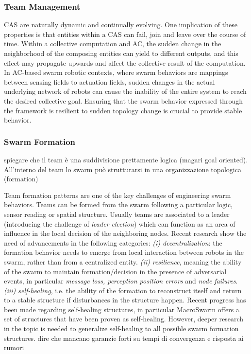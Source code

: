 \documentclass[12pt]{article}
\begin{document}
\subsubsection{Team Management}
CAS are naturally dynamic and continually evolving. One implication of these properties is that entities within a CAS can fail, join and leave over the course of time.
Within a collective computation and AC, the sudden change in the neighborhood of the composing entities can yield to different outputs, and this effect may propagate upwards and
affect the collective result of the computation. In AC-based swarm robotic contexts, where swarm behaviors are mappings between sensing fields to actuation fields, sudden changes
in the actual underlying network of robots can cause the inability of the entire system to reach the desired collective goal. Ensuring that the swarm behavior expressed through the
framework is resilient to sudden topology change is crucial to provide stable behavior. 

\subsubsection{Swarm Formation}
spiegare che il team è una suddivisione prettamente logica (magari goal oriented).
All'interno del team lo swarm può strutturarsi in una organizzazione topologica (formation)

Team formation patterns are one of the key challenges of engineering swarm behaviors. 
Teams can be formed from the swarm following a particular logic, sensor reading or spatial structure. Usually teams 
are associated to a leader (introducing the challenge of \textit{leader election}) which can function as an area of influence in the
local decision of the neighboring nodes. Recent research show the need of advancements in the following categories:
\textit{(i) decentralization}: the formation behavior needs to emerge from local interaction between robots in the swarm, rather than from a centralized entity. 
\textit{(ii) resilience}, meaning the ability of the swarm to maintain formation/decision
in the presence of adversarial events, in particular \textit{message loss, perception position errors} and \textit{node failures}.
\textit{(iii) self-healing}, i.e. the ability of the formation to reconstruct itself and return to a stable structure if disturbances in the structure happen. Recent progress has been made
regarding self-healing structures, in particular MacroSwarm offers a set of structures that have been proven as self-healing. However, deeper research in the topic is needed to generalize self-healing
to all possible swarm formation structures. dire che mancano garanzie forti su tempi di convergenza e risposta ai rumori
\end{document}
